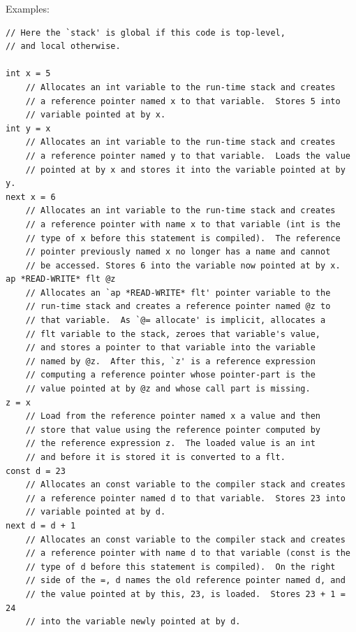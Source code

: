 \documentclass[12pt]{article}
\newenvironment{indpar}[1][0.3in]%
	{\begin{list}{}%
		     {\setlength{\itemsep}{0in}%
		      \setlength{\topsep}{0in}%
		      \setlength{\parsep}{1ex}%
		      \setlength{\labelwidth}{#1}%
		      \setlength{\leftmargin}{#1}%
		      \addtolength{\leftmargin}{\labelsep}}%
	 \item}%
	{\end{list}}
\begin{document}
Examples:
\begin{indpar}\begin{verbatim}
// Here the `stack' is global if this code is top-level,
// and local otherwise.

int x = 5
    // Allocates an int variable to the run-time stack and creates
    // a reference pointer named x to that variable.  Stores 5 into
    // variable pointed at by x.
int y = x
    // Allocates an int variable to the run-time stack and creates
    // a reference pointer named y to that variable.  Loads the value
    // pointed at by x and stores it into the variable pointed at by y.
next x = 6
    // Allocates an int variable to the run-time stack and creates
    // a reference pointer with name x to that variable (int is the
    // type of x before this statement is compiled).  The reference
    // pointer previously named x no longer has a name and cannot
    // be accessed. Stores 6 into the variable now pointed at by x.
ap *READ-WRITE* flt @z
    // Allocates an `ap *READ-WRITE* flt' pointer variable to the
    // run-time stack and creates a reference pointer named @z to
    // that variable.  As `@= allocate' is implicit, allocates a
    // flt variable to the stack, zeroes that variable's value,
    // and stores a pointer to that variable into the variable
    // named by @z.  After this, `z' is a reference expression
    // computing a reference pointer whose pointer-part is the
    // value pointed at by @z and whose call part is missing.
z = x
    // Load from the reference pointer named x a value and then
    // store that value using the reference pointer computed by
    // the reference expression z.  The loaded value is an int
    // and before it is stored it is converted to a flt.
const d = 23
    // Allocates an const variable to the compiler stack and creates
    // a reference pointer named d to that variable.  Stores 23 into
    // variable pointed at by d.
next d = d + 1
    // Allocates an const variable to the compiler stack and creates
    // a reference pointer with name d to that variable (const is the
    // type of d before this statement is compiled).  On the right
    // side of the =, d names the old reference pointer named d, and
    // the value pointed at by this, 23, is loaded.  Stores 23 + 1 = 24
    // into the variable newly pointed at by d.
\end{verbatim}\end{indpar}
\end{document}
